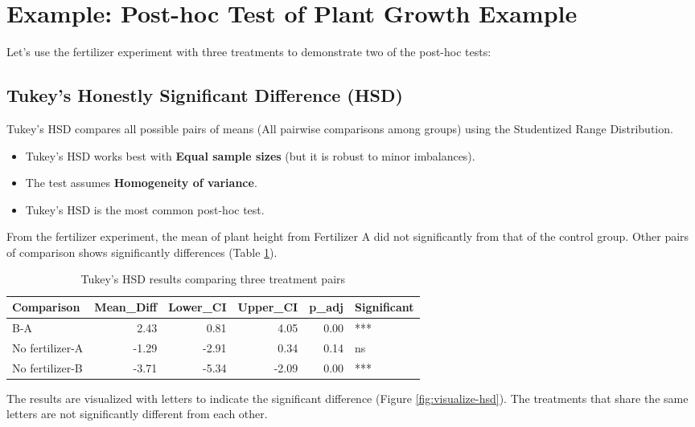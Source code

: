 \documentclass[
]{book}
\providecommand{\tightlist}{%
  \setlength{\itemsep}{0pt}\setlength{\parskip}{0pt}}
\begin{document}
\section{Example: Post-hoc Test of Plant Growth Example}\label{example-post-hoc-test-of-plant-growth-example}

Let's use the fertilizer experiment with three treatments to demonstrate two of the post-hoc tests:

\subsection{Tukey's Honestly Significant Difference (HSD)}\label{tukeys-honestly-significant-difference-hsd}

Tukey's HSD compares all possible pairs of means (All pairwise comparisons among groups) using the Studentized Range Distribution.

\begin{itemize}
\tightlist
\item
  Tukey's HSD works best with \textbf{Equal sample sizes} (but it is robust to minor imbalances).
\item
  The test assumes \textbf{Homogeneity of variance}.
\item
  Tukey's HSD is the most common post-hoc test.
\end{itemize}

From the fertilizer experiment, the mean of plant height from Fertilizer A did not significantly from that of the control group. Other pairs of comparison shows significantly differences (Table \ref{tab:tukey-hsd-tab}).

\begin{table}
\centering
\caption{\label{tab:tukey-hsd-tab}Tukey's HSD results comparing three treatment pairs}
\centering
\begin{tabular}[t]{l|r|r|r|r|l}
\hline
Comparison & Mean\_Diff & Lower\_CI & Upper\_CI & p\_adj & Significant\\
\hline
B-A & 2.43 & 0.81 & 4.05 & 0.00 & ***\\
\hline
No fertilizer-A & -1.29 & -2.91 & 0.34 & 0.14 & ns\\
\hline
No fertilizer-B & -3.71 & -5.34 & -2.09 & 0.00 & ***\\
\hline
\end{tabular}
\end{table}

The results are visualized with letters to indicate the significant difference (Figure \ref{fig:visualize-hsd}). The treatments that share the same letters are not significantly different from each other.
\end{document}
